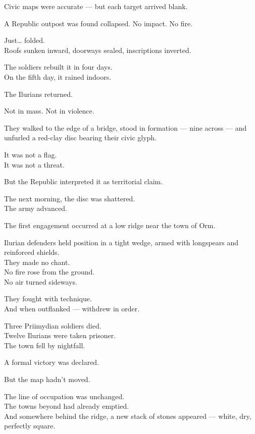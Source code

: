 \documentclass[12pt]{article}
\begin{document}
Civic maps were accurate --- but each target arrived blank.

\vspace{1em}

A Republic outpost was found collapsed. No impact. No fire.

Just… folded.\\
Roofs sunken inward, doorways sealed, inscriptions inverted.

The soldiers rebuilt it in four days.\\
On the fifth day, it rained indoors.

\vspace{1em}

The Ilurians returned.

Not in mass. Not in violence.

They walked to the edge of a bridge, stood in formation --- nine across --- and unfurled a red-clay disc bearing their civic glyph.

It was not a flag.\\
It was not a threat.

But the Republic interpreted it as territorial claim.

The next morning, the disc was shattered.\\
The army advanced.

\vspace{1em}

The first engagement occurred at a low ridge near the town of Orm.

Ilurian defenders held position in a tight wedge, armed with longspears and reinforced shields.\\
They made no chant.\\
No fire rose from the ground.\\
No air turned sideways.

They fought with technique.\\
And when outflanked --- withdrew in order.

Three Priimydian soldiers died.\\
Twelve Ilurians were taken prisoner.\\
The town fell by nightfall.

A formal victory was declared.

\vspace{1em}

But the map hadn’t moved.

The line of occupation was unchanged.\\
The towns beyond had already emptied.\\
And somewhere behind the ridge, a new stack of stones appeared --- white, dry, perfectly square.
\end{document}
